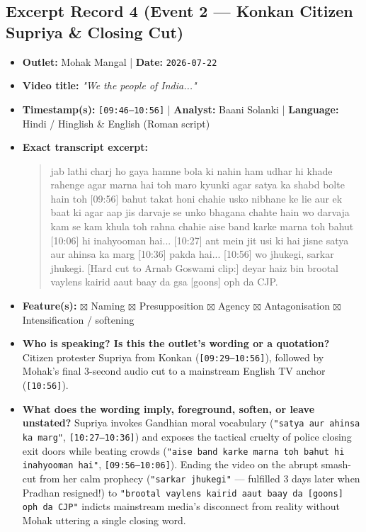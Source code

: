 \documentclass[10pt,a4paper]{article}
\begin{document}
\subsection*{Excerpt Record 4 (Event 2 --- Konkan Citizen Supriya \& Closing Cut)}
\begin{itemize}[leftmargin=1.5em, itemsep=3pt, topsep=4pt]
  \item \textbf{Outlet:} Mohak Mangal | \textbf{Date:} \texttt{2026-07-22}
  \item \textbf{Video title:} \textit{"We the people of India..."}
  \item \textbf{Timestamp(s):} \texttt{[09:46--10:56]} | \textbf{Analyst:} Baani Solanki | \textbf{Language:} Hindi / Hinglish \& English (Roman script)
  \item \textbf{Exact transcript excerpt:}
    \begin{quote}\small{} jab lathi charj ho gaya hamne bola ki nahin ham udhar hi khade rahenge agar marna hai toh maro kyunki agar satya ka shabd bolte hain toh [09:56] bahut takat honi chahie usko nibhane ke lie aur ek baat ki agar aap jis darvaje se unko bhagana chahte hain wo darvaja kam se kam khula toh rahna chahie aise band karke marna toh bahut [10:06] hi inahyooman hai... [10:27] ant mein jit usi ki hai jisne satya aur ahinsa ka marg [10:36] pakda hai... [10:56] wo jhukegi, sarkar jhukegi. [Hard cut to Arnab Goswami clip:] deyar haiz bin brootal vaylens kairid aaut baay da gsa [goons] oph da CJP.\end{quote}
  \item \textbf{Feature(s):} $\boxtimes$ Naming $\boxtimes$ Presupposition $\boxtimes$ Agency $\boxtimes$ Antagonisation $\boxtimes$ Intensification / softening
  \item \textbf{Who is speaking? Is this the outlet's wording or a quotation?} Citizen protester Supriya from Konkan (\texttt{[09:29--10:56]}), followed by Mohak's final 3-second audio cut to a mainstream English TV anchor (\texttt{[10:56]}).
  \item \textbf{What does the wording imply, foreground, soften, or leave unstated?} Supriya invokes Gandhian moral vocabulary (\texttt{"satya aur ahinsa ka marg"}, \texttt{[10:27--10:36]}) and exposes the tactical cruelty of police closing exit doors while beating crowds (\texttt{"aise band karke marna toh bahut hi inahyooman hai"}, \texttt{[09:56--10:06]}). Ending the video on the abrupt smash-cut from her calm prophecy (\texttt{"sarkar jhukegi"} --- fulfilled 3 days later when Pradhan resigned!) to \texttt{"brootal vaylens kairid aaut baay da [goons] oph da CJP"} indicts mainstream media's disconnect from reality without Mohak uttering a single closing word.

\end{itemize}
\end{document}
